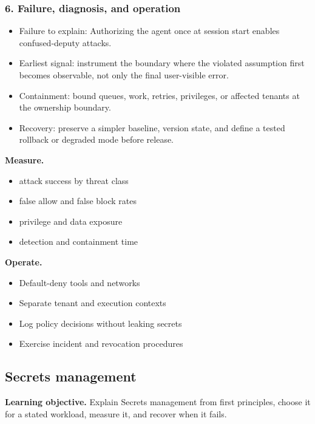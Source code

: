 \subsubsection*{6. Failure, diagnosis, and operation}
\begin{itemize}
\item Failure to explain: Authorizing the agent once at session start enables confused-deputy attacks.
\item Earliest signal: instrument the boundary where the violated assumption first becomes observable, not only the final user-visible error.
\item Containment: bound queues, work, retries, privileges, or affected tenants at the ownership boundary.
\item Recovery: preserve a simpler baseline, version state, and define a tested rollback or degraded mode before release.
\end{itemize}
\textbf{Measure.}\begin{itemize}
\item attack success by threat class
\item false allow and false block rates
\item privilege and data exposure
\item detection and containment time
\end{itemize}
\textbf{Operate.}\begin{itemize}
\item Default-deny tools and networks
\item Separate tenant and execution contexts
\item Log policy decisions without leaking secrets
\item Exercise incident and revocation procedures
\end{itemize}
\subsection{Secrets management}
\textbf{Learning objective.} Explain Secrets management from first principles, choose it for a stated workload, measure it, and recover when it fails.
